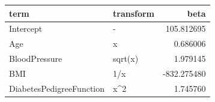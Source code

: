 \begin{tabular}{llr}
\toprule
term & transform & beta \\
\midrule
Intercept & - & 105.812695 \\
Age & x & 0.686006 \\
BloodPressure & sqrt(x) & 1.979145 \\
BMI & 1/x & -832.275480 \\
DiabetesPedigreeFunction & x^2 & 1.745760 \\
\bottomrule
\end{tabular}
